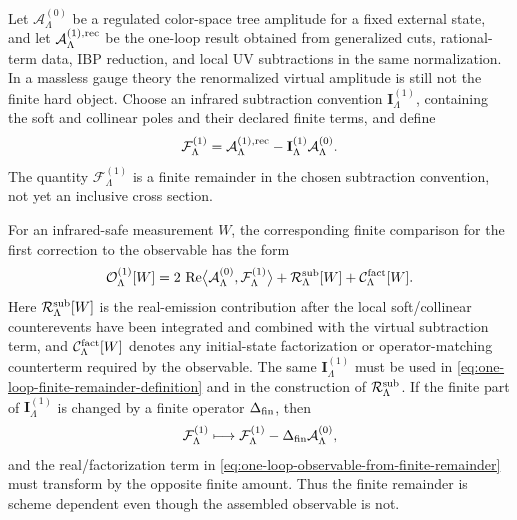 \begin{controlledapproximation}
\label{ca:one-loop-reconstruction-observable-assembly}
Let \(\mathcal A^{(0)}_\Lambda\) be a regulated color-space tree amplitude
for a fixed external state, and let
\(\mathcal A^{(1),{\rm rec}}_\Lambda\) be the one-loop result obtained from
generalized cuts, rational-term data, IBP reduction, and local UV
subtractions in the same normalization.  In a massless gauge theory the
renormalized virtual amplitude is still not the finite hard object.  Choose an
infrared subtraction convention \(\mathbf I^{(1)}_\Lambda\), containing the
soft and collinear poles and their declared finite terms, and define
\begin{equation}
  \mathcal F^{(1)}_\Lambda
  =
  \mathcal A^{(1),{\rm rec}}_\Lambda
  -
  \mathbf I^{(1)}_\Lambda\mathcal A^{(0)}_\Lambda .
  \label{eq:one-loop-finite-remainder-definition}
\end{equation}
The quantity \(\mathcal F^{(1)}_\Lambda\) is a finite remainder in the chosen
subtraction convention, not yet an inclusive cross section.

For an infrared-safe measurement \(W\), the corresponding finite comparison
for the first correction to the observable has the form
\begin{equation}
  \mathcal O_\Lambda^{(1)}[W]
  =
  2\,\operatorname{Re}
    \bigl\langle
      \mathcal A^{(0)}_\Lambda,
      \mathcal F^{(1)}_\Lambda
    \bigr\rangle
  +
  \mathcal R_\Lambda^{\rm sub}[W]
  +
  \mathcal C_\Lambda^{\rm fact}[W].
  \label{eq:one-loop-observable-from-finite-remainder}
\end{equation}
Here \(\mathcal R_\Lambda^{\rm sub}[W]\) is the real-emission contribution
after the local soft/collinear counterevents have been integrated and combined
with the virtual subtraction term, and
\(\mathcal C_\Lambda^{\rm fact}[W]\) denotes any initial-state factorization
or operator-matching counterterm required by the observable.  The same
\(\mathbf I^{(1)}_\Lambda\) must be used in
\eqref{eq:one-loop-finite-remainder-definition} and in the construction of
\(\mathcal R_\Lambda^{\rm sub}\).  If the finite part of
\(\mathbf I^{(1)}_\Lambda\) is changed by a finite operator
\(\Delta_{\rm fin}\), then
\[
  \mathcal F^{(1)}_\Lambda
  \longmapsto
  \mathcal F^{(1)}_\Lambda-\Delta_{\rm fin}\mathcal A^{(0)}_\Lambda,
\]
and the real/factorization term in
\eqref{eq:one-loop-observable-from-finite-remainder} must transform by the
opposite finite amount.  Thus the finite remainder is scheme dependent even
though the assembled observable is not.


\end{controlledapproximation}
